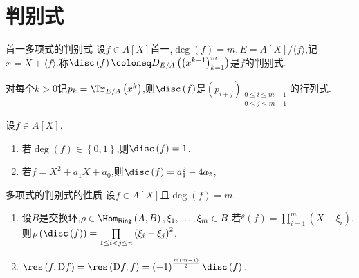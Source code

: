 \section{判别式}

\begin{definition}{首一多项式的判别式}{}
	设$f\in A[X]$首一,$\deg\left(f\right)=m,E=A[X]/\langle f\rangle$,记$x=X+\langle f\rangle$.称$\disc\left(f\right)\coloneq D_{E/A}\left(\left(x^{k-1}\right)_{k=1}^{m}\right)$是$f$的判别式.
\end{definition}

\begin{remark}{}{}
	对每个$k>0$记$p_{k}=\Tr_{E/A}\left(x^{k}\right)$,则$\disc\left(f\right)$是$\left(p_{i+j}\right)_{\substack{0\leq i\leq m-1\\ 0\leq j\leq m-1}}$的行列式.
\end{remark}

\begin{example}{}{}
	设$f\in A[X]$.
	\begin{enumerate}
		\item 若$\deg\left(f\right)\in\left\{0,1\right\}$,则$\disc\left(f\right)=1$.
		\item 若$f=X^{2}+a_{1}X+a_{0}$,则$\disc\left(f\right)=a_{1}^{2}-4a_{2}$,
	\end{enumerate}
\end{example}

\begin{proposition}{多项式的判别式的性质}{}
	设$f\in A[X]$且$\deg\left(f\right)=m$.
	\begin{enumerate}
		\item 设$B$是交换环,$\rho\in\Hom_{\mathsf{Ring}}\left(A,B\right),\xi_{1},\ldots,\xi_{m}\in B$.若$^{\rho}\left(f\right)=\prod\limits_{i=1}^{m}\left(X-\xi_{i}\right)$,则$\rho\left(\disc\left(f\right)\right)=\prod\limits_{1\leq i<j\leq n}\left(\xi_{i}-\xi_{j}\right)^{2}$.
		\item $\res\left(f,\mathrm{D}f\right)=\res\left(\mathrm{D}f,f\right)=\left(-1\right)^{\frac{m\left(m-1\right)}{2}}\disc\left(f\right)$.
	\end{enumerate}
\end{proposition}

